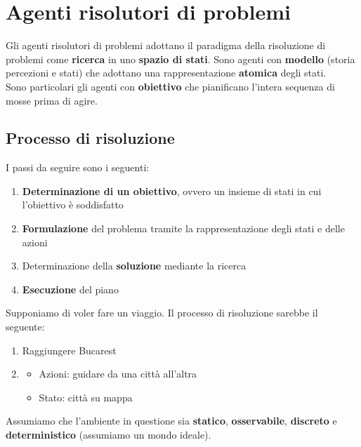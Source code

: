 \newpage
\section{Agenti risolutori di problemi}
Gli agenti risolutori di problemi adottano il paradigma della risoluzione di problemi come \textbf{ricerca} in uno \textbf{spazio di stati}. Sono agenti con \textbf{modello} (storia percezioni e stati) che adottano una rappresentazione \textbf{atomica} degli stati.\\
Sono particolari gli agenti con \textbf{obiettivo} che pianificano l'intera sequenza di mosse prima di agire.

\subsection{Processo di risoluzione}
I passi da seguire sono i seguenti:
\begin{enumerate}
	\item \textbf{Determinazione di un obiettivo}, ovvero un insieme di stati in cui l'obiettivo è soddisfatto
	\item \textbf{Formulazione} del problema tramite la rappresentazione degli stati e delle azioni
	\item Determinazione della \textbf{soluzione} mediante la ricerca
	\item \textbf{Esecuzione} del piano
\end{enumerate}

\begin{example}
	Supponiamo di voler fare un viaggio. Il processo di risoluzione sarebbe il seguente:
	\begin{enumerate}
		\item Raggiungere Bucarest
		\item \begin{itemize}
			\item Azioni: guidare da una città all'altra
			\item Stato: città su mappa
		\end{itemize}
	\end{enumerate}
\end{example}

Assumiamo che l'ambiente in questione sia \textbf{statico}, \textbf{osservabile}, \textbf{discreto} e \textbf{deterministico} (assumiamo un mondo ideale).

